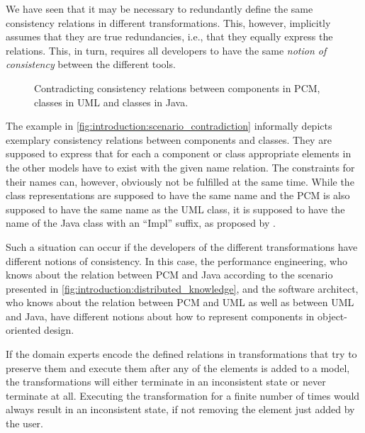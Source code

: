 We have seen that it may be necessary to redundantly define the same consistency relations in different transformations.
This, however, implicitly assumes that they are true redundancies, i.e., that they equally express the relations.
This, in turn, requires all developers to have the same \emph{notion of consistency} between the different tools.

\begin{figure}
    \centering
    
    \caption[Example for transformation contradictions]{Contradicting consistency relations between components in \gls{PCM}, classes in \gls{UML} and classes in Java.}
    \label{fig:introduction:scenario_contradiction}
\end{figure}

The example in \autoref{fig:introduction:scenario_contradiction} informally depicts exemplary consistency relations between components and classes.
They are supposed to express that for each a component or class appropriate elements in the other models have to exist with the given name relation.
The constraints for their names can, however, obviously not be fulfilled at the same time.
While the class representations are supposed to have the same name and the \gls{PCM} is also supposed to have the same name as the \gls{UML} class, it is supposed to have the name of the Java class with an \enquote{Impl} suffix, as proposed by \textcite{langhammer2017a}.

Such a situation can occur if the developers of the different transformations have different notions of consistency.
In this case, the performance engineering, who knows about the relation between \gls{PCM} and Java according to the scenario presented in \autoref{fig:introduction:distributed_knowledge}, and the software architect, who knows about the relation between \gls{PCM} and \gls{UML} as well as between \gls{UML} and Java, have different notions about how to represent components in object-oriented design.

If the domain experts encode the defined relations in transformations that try to preserve them and execute them after any of the elements is added to a model, the transformations will either terminate in an inconsistent state or never terminate at all.
Executing the transformation for a finite number of times would always result in an inconsistent state, if not removing the element just added by the user.

